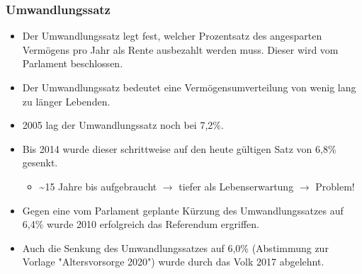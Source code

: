 \subsubsection{Umwandlungssatz}
\begin{itemize}
	\item Der Umwandlungssatz legt fest, welcher Prozentsatz des angesparten Vermögens pro Jahr als Rente ausbezahlt werden muss. Dieser wird vom Parlament beschlossen.
	\item Der Umwandlungssatz bedeutet eine Vermögensumverteilung von wenig lang zu länger Lebenden.
	\item 2005 lag der Umwandlungssatz noch bei 7,2\%.
	\item Bis 2014 wurde dieser schrittweise auf den heute gültigen Satz von 6,8\% gesenkt.
	\begin{itemize}
		\item \textasciitilde 15 Jahre bis aufgebraucht $\rightarrow$ tiefer als Lebenserwartung $\rightarrow$ Problem!
	\end{itemize}
	\item Gegen eine vom Parlament geplante Kürzung des Umwandlungssatzes auf 6,4\% wurde 2010 erfolgreich das Referendum ergriffen.
	\item Auch die Senkung des Umwandlungssatzes auf 6,0\% (Abstimmung zur Vorlage "Altersvorsorge 2020") wurde durch das Volk 2017 abgelehnt.
\end{itemize}

